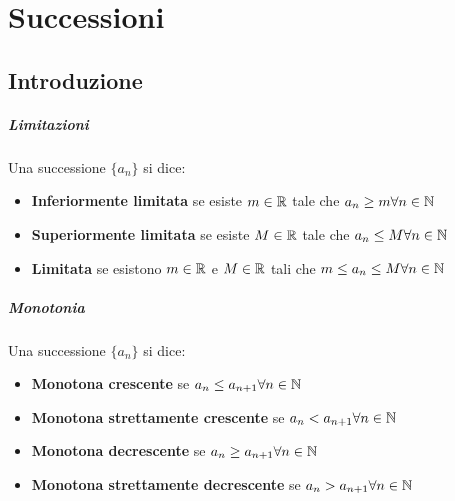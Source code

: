\documentclass[12pt, a4paper, openany]{book}
\begin{document}
\chapter{Successioni}

\section{Introduzione}

\paragraph*{Limitazioni} Una successione $\{a_n\}$ si dice:
\begin{itemize}
	\item \textbf{Inferiormente limitata} se esiste $m \in \mathbb{R}$ tale che $a_n \geq m \forall n \in \mathbb{N}$
	\item \textbf{Superiormente limitata} se esiste $M \in \mathbb{R}$ tale che $a_n \leq M \forall n \in \mathbb{N}$
	\item \textbf{Limitata} se esistono $m \in \mathbb{R}$ e $M \in \mathbb{R}$ tali che $m \leq a_n \leq M \forall n \in \mathbb{N}$
\end{itemize}

\paragraph*{Monotonia} Una successione $\{a_n\}$ si dice:
\begin{itemize}
	\item \textbf{Monotona crescente} se $a_n\leq a_{n+1} \forall n \in \mathbb{N}$
	\item \textbf{Monotona strettamente crescente} se $a_n < a_{n+1} \forall n \in \mathbb{N}$
	\item \textbf{Monotona decrescente} se $a_n \geq a_{n+1} \forall n\in\mathbb{N}$
	\item \textbf{Monotona strettamente decrescente} se $a_n > a_{n+1} \forall n \in \mathbb{N}$
\end{itemize}
\end{document}

